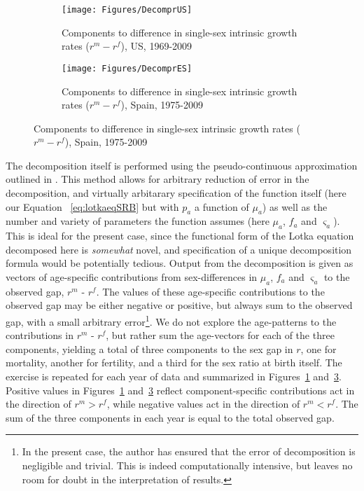 \begin{figure}[h!]
        \centering
        \begin{subfigure}
                \centering
                \caption{Components to difference in single-sex intrinsic growth
                rates ($r^m - r^f$), US, 1969-2009}
                \texttt{[image: Figures/DecomprUS]}
                \label{fig:DecomprUS}
        \end{subfigure}
        \begin{subfigure}
                \centering
                \caption{Components to difference in single-sex intrinsic growth
                rates ($r^m - r^f$), Spain, 1975-2009}
                \texttt{[image: Figures/DecomprES]}  
                \label{fig:DecomprES}
        \end{subfigure}
\end{figure}

The decomposition itself is performed using the
pseudo-continuous approximation outlined in \citet{horiuchi2008decomposition}. 
This method allows for arbitrary reduction of error in the decomposition, and
virtually arbitarary specification of the function itself (here our Equation
~\eqref{eq:lotkaeqSRB} but with $p_a$ a function of $\mu_a$) as well as the
number and variety of parameters the function assumes (here $\mu _a$, $f_a$ and $\varsigma _a$). 
This is ideal for
the present case, since the functional form of the Lotka equation decomposed
here is \textit{somewhat} novel, and specification of a unique decomposition
formula would be potentially tedious. Output from the decomposition is given as
vectors of age-specific contributions from sex-differences in $\mu
_a$, $f_a$ and $\varsigma _a$ to the observed gap, $r^m$ - $r^f$. The values 
of these age-specific contributions to the observed gap may be either negative or
positive, but always sum to the observed gap, with a small arbitrary
error\footnote{In the present case, the author has ensured that the error of
decomposition is negligible and trivial. This is indeed computationally
intensive, but leaves no room for doubt in the interpretation of results.}. We
do not explore the age-patterns to the contributions in $r^m$ - $r^f$, but
rather sum the age-vectors for each of the three components, yielding a total of
three components to the sex gap in $r$, one for mortality, another for
fertility, and a third for the sex ratio at birth itself. The exercise is
repeated for each year of data and summarized in Figures~\ref{fig:DecomprUS}
and~\ref{fig:DecomprES}.
\FloatBarrier
Positive values in Figures~\ref{fig:DecomprUS} and~\ref{fig:DecomprES} reflect
component-specific contributions act in the direction of $r^m > r^f$, while
negative values act in the direction of $r^m < r^f$. The sum of the three
components in each year is equal to the total observed gap. 

